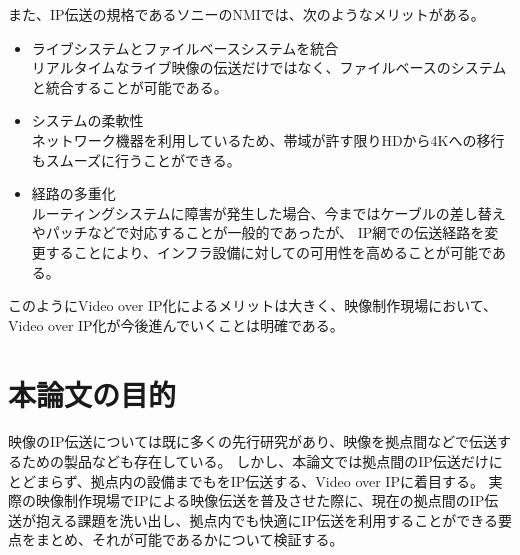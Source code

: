 \newpage
また、IP伝送の規格であるソニーのNMI\cite{sony-nmi}では、次のようなメリットがある。
\begin{itemize}
  \item ライブシステムとファイルベースシステムを統合\mbox{}\\
    リアルタイムなライブ映像の伝送だけではなく、ファイルベースのシステムと統合することが可能である。
  \item システムの柔軟性\mbox{}\\
    ネットワーク機器を利用しているため、帯域が許す限りHDから4Kへの移行もスムーズに行うことができる。
  \item 経路の多重化\mbox{}\\
    ルーティングシステムに障害が発生した場合、今まではケーブルの差し替えやパッチなどで対応することが一般的であったが、
    IP網での伝送経路を変更することにより、インフラ設備に対しての可用性を高めることが可能である。
\end{itemize}

このようにVideo over IP化によるメリットは大きく、映像制作現場において、Video over IP化が今後進んでいくことは明確である。

\section{本論文の目的}
映像のIP伝送については既に多くの先行研究があり、映像を拠点間などで伝送するための製品なども存在している。
しかし、本論文では拠点間のIP伝送だけにとどまらず、拠点内の設備までもをIP伝送する、Video over IPに着目する。
実際の映像制作現場でIPによる映像伝送を普及させた際に、現在の拠点間のIP伝送が抱える課題を洗い出し、拠点内でも快適にIP伝送を利用することができる要点をまとめ、それが可能であるかについて検証する。

